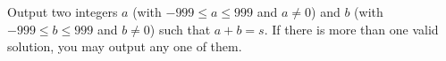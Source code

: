 
  Output two integers
  $a$ (with $-999\leq a\leq 999$ and $a\neq 0$) 
  and 
  $b$ (with $-999\leq b\leq 999$ and $b\neq 0$) 
  such that $a+b=s$.
  If there is more than one valid solution, you may output any one of them.

